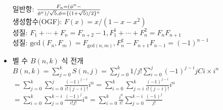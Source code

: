 \begin{itemize}[noitemsep]
    일반항: $F_n = (\phi^n - \over{\phi}^n) / \sqrt{5}, \phi = \{(1+\sqrt{5})/2\}^n$\\
    생성함수(OGF): $F(x) = x/(1-x-x^2)$\\
    성질: $F_1 + \cdots + F_n = F_{n+2}-1, F_1^1 + \cdots + F_n^2 = F_nF_{n+1}$\\
    성질: $\text{gcd}(F_n,F_m)=F_{\text{gcd}(n,m)}, F_n^2 - F_{n+1}F_{n-1} = (-1)^{n-1}$
    \item 벨 수 $B(n, k)$ 식 전개\\
    $B(n,k)=\sum_{j=0}^{k}S(n,j) = \sum_{j=0}^{k} 1/j! \sum_{i=0}^{j} (-1)^{j-i} jCi \times i^n$\\
    $=\sum_{j=0}^{k}\sum_{i=0}^{j} \frac{(-1)^{j-i}}{i!(j-i)!}i^n=\sum_{i=0}^{k}\sum_{j=i}^{k}\frac{(-1)^{j-i}}{i!(j-i)!}i^n$\\
    $=\sum_{i=0}^{k}\sum_{j=0}^{k-i}\frac{(-1)^j}{i!j!}i^n = \sum_{i=0}^k \frac{i^n}{i!}\sum_{j=0}^{k-i} \frac{(-1)^j}{j!}$
\end{itemize}